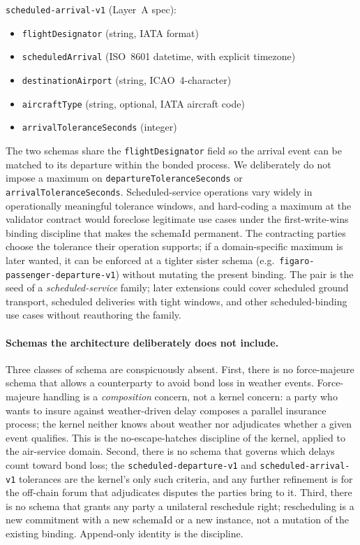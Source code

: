 \documentclass[11pt,a4paper]{article}
\theoremstyle{definition}
\theoremstyle{remark}
\begin{document}
\texttt{scheduled-arrival-v1} (Layer~A spec):
\begin{itemize}
  \item \texttt{flightDesignator} (string, IATA format)
  \item \texttt{scheduledArrival} (ISO~8601 datetime, with explicit timezone)
  \item \texttt{destinationAirport} (string, ICAO~4-character)
  \item \texttt{aircraftType} (string, optional, IATA aircraft code)
  \item \texttt{arrivalToleranceSeconds} (integer)
\end{itemize}

The two schemas share the \texttt{flightDesignator} field so the
arrival event can be matched to its departure within the bonded
process. We deliberately do not impose a maximum on
\texttt{departureToleranceSeconds} or
\texttt{arrivalToleranceSeconds}. Scheduled-service operations
vary widely in operationally meaningful tolerance windows, and
hard-coding a maximum at the validator contract would foreclose
legitimate use cases under the first-write-wins binding discipline
that makes the schemaId permanent. The contracting parties choose
the tolerance their operation supports; if a domain-specific
maximum is later wanted, it can be enforced at a tighter sister
schema (e.g.\ \texttt{figaro-passenger-departure-v1}) without
mutating the present binding. The pair is the seed of a
\emph{scheduled-service} family; later extensions could cover
scheduled ground transport, scheduled deliveries with tight
windows, and other scheduled-binding use cases without
reauthoring the family.

\paragraph{Schemas the architecture deliberately does not include.}
Three classes of schema are conspicuously absent. First, there is
no force-majeure schema that allows a counterparty to avoid bond
loss in weather events. Force-majeure handling is a
\emph{composition} concern, not a kernel concern: a party who
wants to insure against weather-driven delay composes a parallel
insurance process; the kernel neither knows about weather nor
adjudicates whether a given event qualifies. This is the
no-escape-hatches discipline of the kernel, applied to the
air-service domain. Second, there is no schema that governs which
delays count toward bond loss; the
\texttt{scheduled-departure-v1} and
\texttt{scheduled-arrival-v1} tolerances are the kernel's only
such criteria, and any further refinement is for the off-chain
forum that adjudicates disputes the parties bring to it. Third,
there is no schema that grants any party a unilateral reschedule
right; rescheduling is a new commitment with a new schemaId or a
new instance, not a mutation of the existing binding. Append-only
identity is the discipline.
\end{document}
